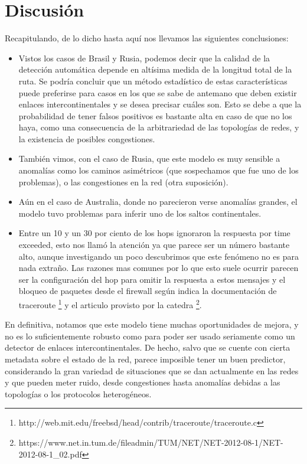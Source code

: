 \section{Discusión}

Recapitulando, de lo dicho hasta aquí nos llevamos las siguientes conclusiones:

\begin{itemize}
	\item Vistos los casos de Brasil y Rusia, podemos decir que la calidad de la detección automática depende en altísima medida de la longitud total de la ruta. Se podría concluir que un método estadístico de estas características puede preferirse para casos en los que se sabe de antemano que deben existir enlaces intercontinentales y se desea precisar cuáles son. Esto se debe a que la probabilidad de tener falsos positivos es bastante alta en caso de que no los haya, como una consecuencia de la arbitrariedad de las topologías de redes, y la existencia de posibles congestiones.
	\item También vimos, con el caso de Rusia, que este modelo es muy sensible a anomalías como los caminos asimétricos (que sospechamos que fue uno de los problemas), o las congestiones en la red (otra suposición).
	\item Aún en el caso de Australia, donde no parecieron verse anomalías grandes, el modelo tuvo problemas para inferir uno de los saltos continentales.
	\item Entre un 10 y un 30 por ciento de los hops ignoraron la respuesta por time exceeded, esto nos llamó la atención ya que parece ser un número bastante alto, aunque investigando un poco descubrimos que este fenómeno no es para nada extraño. Las razones mas comunes por lo que esto suele ocurrir parecen ser la configuración del hop para omitir la respuesta a estos mensajes y el bloqueo de paquetes desde el firewall según indica la documentación de traceroute \footnote{http://web.mit.edu/freebsd/head/contrib/traceroute/traceroute.c} y el articulo provisto por la catedra \footnote{https://www.net.in.tum.de/fileadmin/TUM/NET/NET-2012-08-1/NET-2012-08-1\_02.pdf}.

\end{itemize}

En definitiva, notamos que este modelo tiene muchas oportunidades de mejora, y no es lo suficientemente robusto como para poder ser usado seriamente como un detector de enlaces intercontinentales. De hecho, salvo que se cuente con cierta metadata sobre el estado de la red, parece imposible tener un buen predictor, considerando la gran variedad de situaciones que se dan actualmente en las redes y que pueden meter ruido, desde congestiones hasta anomalías debidas a las topologías o los protocolos heterogéneos.
